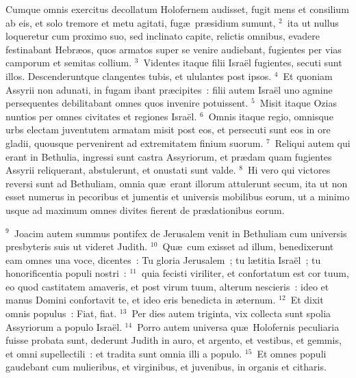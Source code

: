 \bchapter
\lettrine[lines=3,image=true,loversize=0.05,lraise=-0.03]{C}{}umque omnis exercitus decollatum Holofernem audisset, fugit mens et consilium ab eis, et solo tremore et metu agitati, fug\ae\ pr\ae sidium sumunt,
${}^{2}$~ita ut nullus loqueretur cum proximo suo, sed inclinato capite, relictis omnibus, evadere festinabant Hebr\ae os, quos armatos super se venire audiebant, fugientes per vias camporum et semitas collium.
${}^{3}$~Videntes itaque filii Isra\"el fugientes, secuti sunt illos. Descenderuntque clangentes tubis, et ululantes post ipsos.
${}^{4}$~Et quoniam Assyrii non adunati, in fugam ibant pr\ae cipites~: filii autem Isra\"el uno agmine persequentes debilitabant omnes quos invenire potuissent.
${}^{5}$~Misit itaque Ozias nuntios per omnes civitates et regiones Isra\"el.
${}^{6}$~Omnis itaque regio, omnisque urbs electam juventutem armatam misit post eos, et persecuti sunt eos in ore gladii, quousque pervenirent ad extremitatem finium suorum.
${}^{7}$~Reliqui autem qui erant in Bethulia, ingressi sunt castra Assyriorum, et pr\ae dam quam fugientes Assyrii reliquerant, abstulerunt, et onustati sunt valde.
${}^{8}$~Hi vero qui victores reversi sunt ad Bethuliam, omnia qu\ae\ erant illorum attulerunt secum, ita ut non esset numerus in pecoribus et jumentis et universis mobilibus eorum, ut a minimo usque ad maximum omnes divites fierent de pr\ae dationibus eorum.


${}^{9}$~Joacim autem summus pontifex de Jerusalem venit in Bethuliam cum universis presbyteris suis ut videret Judith.
${}^{10}$~Qu\ae\ cum exisset ad illum, benedixerunt eam omnes una voce, dicentes~: Tu gloria Jerusalem~; tu l\ae titia Isra\"el~; tu honorificentia populi nostri~:
${}^{11}$~quia fecisti viriliter, et confortatum est cor tuum, eo quod castitatem amaveris, et post virum tuum, alterum nescieris~: ideo et manus Domini confortavit te, et ideo eris benedicta in \ae ternum.
${}^{12}$~Et dixit omnis populus~: Fiat, fiat.
${}^{13}$~Per dies autem triginta, vix collecta sunt spolia Assyriorum a populo Isra\"el.
${}^{14}$~Porro autem universa qu\ae\ Holofernis peculiaria fuisse probata sunt, dederunt Judith in auro, et argento, et vestibus, et gemmis, et omni supellectili~: et tradita sunt omnia illi a populo.
${}^{15}$~Et omnes populi gaudebant cum mulieribus, et virginibus, et juvenibus, in organis et citharis.

